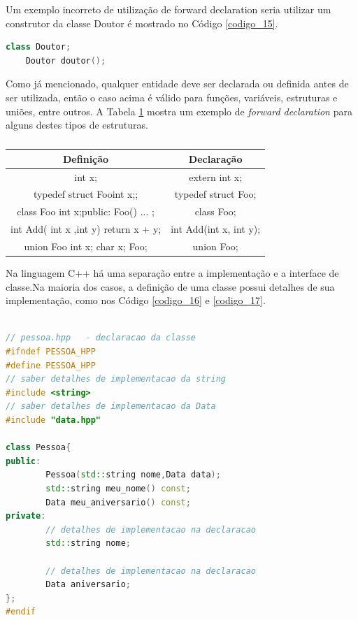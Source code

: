 Um exemplo incorreto de utilização de forward declaration seria utilizar
 um construtor da classe Doutor é mostrado no Código \ref{codigo_15}.


\begin{lstlisting}[language=C++,frame=single,title={Código 15: 
                   Uso incorreto de Forward Declaration},
                                                label=codigo_15]
    class Doutor;
    Doutor doutor();

\end{lstlisting}

Como já mencionado, qualquer entidade deve ser declarada ou definida antes
 de ser utilizada, então o caso acima é válido para funções, variáveis,
 estruturas e uniões, entre outros. A Tabela \ref{tab:tabela_03} mostra
 um exemplo de \textit{ forward declaration} para alguns destes tipos
 de estruturas.

\begin{table}[h]
    \label{tab:tabela_03}
    \caption {}
    \centering
    \begin{tabular}{ |c | c |}
    \hline
    Definição & Declaração\\
    \hline
    int x; & extern int x;\\
    \hline
    typedef struct Foo{int x;}; & typedef struct Foo;\\
    \hline
    class Foo { int x;public: Foo() ... }; & class Foo;\\
    \hline
    int Add( int x ,int  y) { return x + y; } & int Add(int x, int y);\\
    \hline
    union Foo { int x; char x; }Foo; & union Foo;\\
    \hline
    \end{tabular}
\end{table}



Na linguagem C++ há uma separação entre  a implementação e a interface de
 classe\cite{ref44}.Na maioria dos casos, a definição de uma classe possui
 detalhes de sua implementação, como nos Código \ref{codigo_16} e \ref{codigo_17}.


\begin{lstlisting}[language=C++,frame=single,title={Código 16: 
                          Arquivo declaração da classe Pessoa },
                                                label=codigo_16]

// pessoa.hpp   - declaracao da classe
#ifndef PESSOA_HPP
#define PESSOA_HPP
// saber detalhes de implementacao da string
#include <string>       
// saber detalhes de implementacao da Data
#include "data.hpp"     

class Pessoa{
public:
        Pessoa(std::string nome,Data data);
        std::string meu_nome() const;
        Data meu_aniversario() const;
private:
        // detalhes de implementacao na declaracao
        std::string nome;        

        // detalhes de implementacao na declaracao
        Data aniversario;        
};
#endif

\end{lstlisting}

